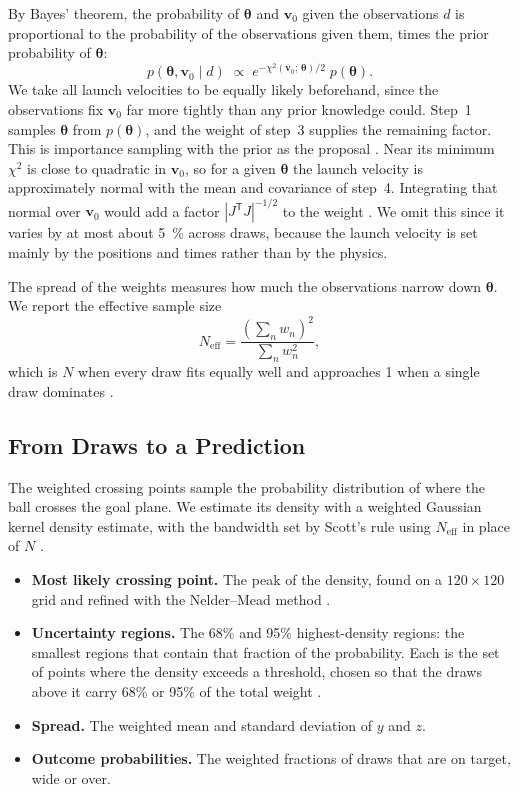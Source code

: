 \documentclass[10pt,a4paper]{article}
\begin{document}
By Bayes' theorem,
the probability of $\bm{\theta}$ and $\bm{v}_0$ given the observations $d$ is
proportional to the probability of the observations given them, times the
prior probability of $\bm{\theta}$:
\begin{equation}
  p(\bm{\theta}, \bm{v}_0 \mid d) \;\propto\;
  e^{-\chi^2(\bm{v}_0;\, \bm{\theta})/2}\; p(\bm{\theta}).
  \label{eq:bayes}
\end{equation}
We take all launch velocities to be equally likely beforehand, since the
observations fix $\bm{v}_0$ far more tightly than any prior knowledge could.
Step~1 samples $\bm{\theta}$ from $p(\bm{\theta})$, and the weight of step~3
supplies the remaining factor. This is importance sampling with the prior as
the proposal \citep{robert2004}. Near its minimum $\chi^2$ is close to
quadratic in $\bm{v}_0$, so for a given $\bm{\theta}$ the launch velocity is
approximately normal with the mean and covariance of step~4. Integrating that
normal over $\bm{v}_0$ would add a factor $|J^\mathsf{T}J|^{-1/2}$ to the
weight \citep{tierney1986}. We omit this since it varies by at most about
\SI{5}{\percent} across draws, because the launch velocity is set mainly by
the positions and times rather than by the physics.

The spread of the weights measures how much the observations narrow down
$\bm{\theta}$. We report the effective sample size
\begin{equation}
  N_{\mathrm{eff}} = \frac{\left(\sum_n w_n\right)^2}{\sum_n w_n^2},
  \label{eq:ess}
\end{equation}
which is $N$ when every draw fits equally well and approaches 1 when a single
draw dominates \citep{kish1965}.

\subsection{From Draws to a Prediction}
\label{sec:summaries}

The weighted crossing points sample the probability distribution of where
the ball crosses the goal plane. We estimate its density with a weighted
Gaussian kernel density estimate, with the bandwidth set by Scott's rule
using $N_{\mathrm{eff}}$ in place of $N$ \citep{scott1992}.
\begin{itemize}
  \item \textbf{Most likely crossing point.} The peak of the density, found on
    a $120 \times 120$ grid and refined with the Nelder--Mead method
    \citep{nelder1965}.
  \item \textbf{Uncertainty regions.} The 68\% and 95\% highest-density
    regions: the smallest regions that contain that fraction of the
    probability. Each is the set of points where the density exceeds a
    threshold, chosen so that the draws above it carry 68\% or 95\% of the
    total weight \citep{hyndman1996}.
  \item \textbf{Spread.} The weighted mean and standard deviation of $y$ and
    $z$.
  \item \textbf{Outcome probabilities.} The weighted fractions of draws that
    are on target, wide or over.
\end{itemize}
\end{document}
